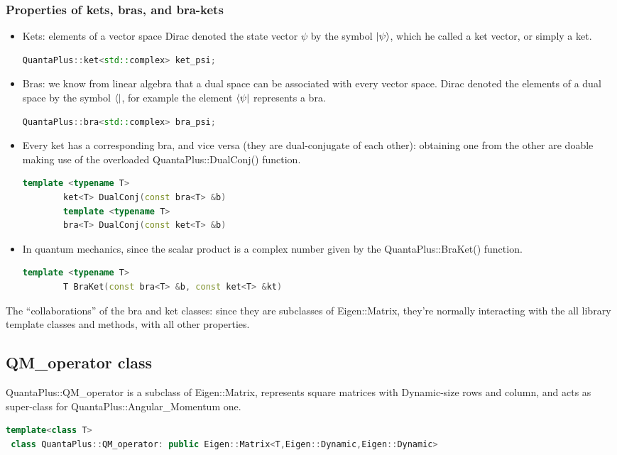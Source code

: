 \documentclass[10pt,a4paper]{article}
\begin{document}
\subsubsection{Properties of kets, bras, and bra-kets}
\begin{itemize}
	\item Kets: elements of a vector space Dirac denoted the state vector $\psi$ by the symbol $\ket{\psi}$, which he called a ket vector, or simply a ket.
	\begin{lstlisting}[language=c++]
		QuantaPlus::ket<std::complex> ket_psi;
	\end{lstlisting}
	\item Bras: we know from linear algebra that a dual space can be associated with every vector space. Dirac denoted the elements of a dual space by the symbol $\bra{}$, for example the element $\bra{\psi}$ represents a bra.
	\begin{lstlisting}[language=c++]
		QuantaPlus::bra<std::complex> bra_psi;
	\end{lstlisting}
	\item Every ket has a corresponding bra, and vice versa (they are dual-conjugate of each other): obtaining one from the other are doable making use of the overloaded QuantaPlus::DualConj() function.  
	
	\begin{lstlisting}[language=c++, caption=the ket and bra dual Conjugate functions]
		template <typename T>
		ket<T> DualConj(const bra<T> &b)
		template <typename T>
		bra<T> DualConj(const ket<T> &b) 
	\end{lstlisting}
	\item In quantum mechanics, since the scalar product is a complex number given by the QuantaPlus::BraKet() function.
	\begin{lstlisting}[language=c++, caption= Bra-ket: Dirac notation for the scalar product]
		template <typename T> 
		T BraKet(const bra<T> &b, const ket<T> &kt)
	\end{lstlisting}
	
\end{itemize}
 
The “collaborations” of the bra and ket classes: since they are subclasses of Eigen::Matrix, they're normally interacting with the all  library template classes and methods, with all other properties.
\subsection{QM\_operator class}
QuantaPlus::QM\_operator is a  subclass of Eigen::Matrix, represents square matrices with Dynamic-size rows and column, and acts as super-class for QuantaPlus::Angular\_Momentum one.
\begin{lstlisting}[language=c++, caption= QM\_operator class]
 template<class T> 
 class QuantaPlus::QM_operator: public Eigen::Matrix<T,Eigen::Dynamic,Eigen::Dynamic>
\end{lstlisting}
\end{document}
